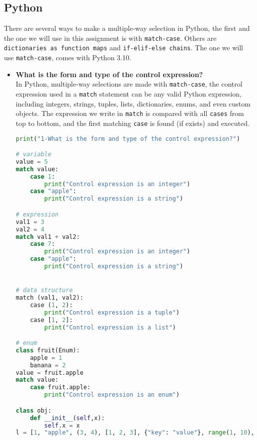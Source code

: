 \documentclass{article}
\begin{document}
\subsection{Python}
There are several ways to make a multiple-way selection in Python, the first and the one we will use in this assignment is with \texttt{match-case}. Others are \texttt{dictionaries as function maps} and \texttt{if-elif-else chains}. The one we will use \texttt{match-case}, comes with Python 3.10.


\begin{itemize}
\item \textbf{What is the form and type of the control expression?} \\
In Python, multiple-way selections are made with \texttt{match-case}, the control expression used in a \texttt{match} statement can be any valid Python expression, including integers, strings, tuples, lists, dictionaries, enums, and even custom objects. The expression we write in \texttt{match} is compared with all \texttt{cases} from top to bottom, and the first matching \texttt{case} is found (if exists) and executed.\\
\begin{lstlisting}[language=Python]
print("1-What is the form and type of the control expression?")

# variable
value = 5
match value:
    case 1:
        print("Control expression is an integer")
    case "apple":
        print("Control expression is a string")

# expression
val1 = 3
val2 = 4
match val1 + val2:
    case 7:
        print("Control expression is an integer")
    case "apple":
        print("Control expression is a string")


# data structure
match (val1, val2):
    case (1, 2):
        print("Control expression is a tuple")
    case [1, 2]:
        print("Control expression is a list")

# enum
class fruit(Enum):
    apple = 1
    banana = 2
value = fruit.apple
match value:
    case fruit.apple:
        print("Control expression is an enum")

class obj:
    def __init__(self,x):
        self.x = x
l = [1, "apple", (3, 4), [1, 2, 3], {"key": "value"}, range(1, 10), {1, 2, 3}, True, None, obj(3)]


\end{lstlisting}
\end{itemize}
\end{document}
